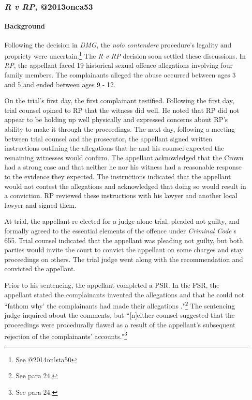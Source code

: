 \subsubsection{\textit{R v RP}, @2013onca53}

\paragraph{Background\\}

Following the decision in \textit{DMG}, the \textit{nolo contendere} procedure's legality and propriety were uncertain.\footnote{See @2014onlsta50} The \textit{R v RP} decision soon settled these discussions. In \textit{RP}, the appellant faced 19 historical sexual offence allegations involving four family members. The complainants alleged the abuse occurred between ages 3 and 5 and ended between ages 9 - 12.

On the trial's first day, the first complainant testified. Following the first day, trial counsel opined to RP that the witness did well. He noted that RP did not appear to be holding up well physically and expressed concerns about RP's ability to make it through the proceedings. The next day, following a meeting between trial counsel and the prosecutor, the appellant signed written instructions outlining the allegations that he and his counsel expected the remaining witnesses would confirm. The appellant acknowledged that the Crown had a strong case and that neither he nor his witness had a reasonable response to the evidence they expected. The instructions indicated that the appellant would not contest the allegations and acknowledged that doing so would result in a conviction. RP reviewed these instructions with his lawyer and another local lawyer and signed them.

At trial, the appellant re-elected for a judge-alone trial, pleaded not guilty, and formally agreed to the essential elements of the offence under \textit{Criminal Code} s 655. Trial counsel indicated that the appellant was pleading not guilty, but both parties would invite the court to convict the appellant on some charges and stay proceedings on others. The trial judge went along with the recommendation and convicted the appellant.

Prior to his sentencing, the appellant completed a PSR. In the PSR, the appellant stated the complainants invented the allegations and that he could not ``fathom why' the complainants had made their allegations ."\footnote{See para 24.} The sentencing judge inquired about the comments, but ``[n]either counsel suggested that the proceedings were procedurally flawed as a result of the appellant's subsequent rejection of the complainants' accounts."\footnote{See para 24.}

